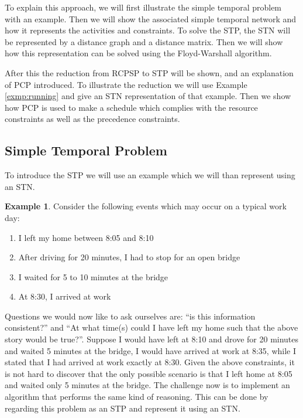\documentclass{article}
\theoremstyle{definition}
\newtheorem{example}{Example}[section]
\begin{document}
To explain this approach, we will first illustrate the simple temporal problem with an example.
Then we will show the associated simple temporal network and how it represents the activities and constraints.
To solve the STP, the STN will be represented by a distance graph and a distance matrix.
Then we will show how this representation can be solved using the Floyd-Warshall algorithm.

After this the reduction from RCPSP to STP will be shown, and an explanation of PCP introduced.
To illustrate the reduction we will use Example \ref{exmp:running} and give an STN representation of that example.
Then we show how PCP is used to make a schedule which complies with the resource constraints as well as the precedence constraints.

\subsection{Simple Temporal Problem}
\label{text:STN}
To introduce the STP we will use an example which we will than represent using an STN.

\begin{example}
\label{exmp:stn}
Consider the following events which may occur on a typical work day:
\begin{enumerate}
\item I left my home between 8:05 and 8:10
\item After driving for 20 minutes, I had to stop for an open bridge
\item I waited for 5 to 10 minutes at the bridge
\item At 8:30, I arrived at work 
\end{enumerate}
\end{example}

Questions we would now like to ask ourselves are: ``is this information consistent?'' and ``At what time(s) could I have left my home such that the above story would be true?''. 
Suppose I would have left at 8:10 and drove for 20 minutes and waited 5 minutes at the bridge, I would have arrived at work at 8:35, while I stated that I had arrived at work exactly at 8:30. 
Given the above constraints, it is not hard to discover that the only possible scenario is that I left home at 8:05 and waited only 5 minutes at the bridge.
The challenge now is to implement an algorithm that performs the same kind of reasoning. 
This can be done by regarding this problem as an STP and represent it using an STN.
\end{document}
